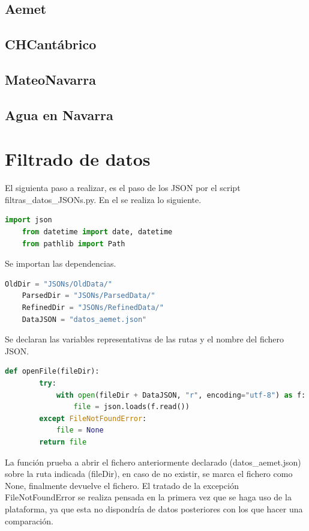 \subsection{Aemet}

\subsection{CHCantábrico}

\subsection{MateoNavarra}

\subsection{Agua en Navarra}

\section{Filtrado de datos}
El siguienta paso a realizar, es el paso de los JSON por el script filtras\_datos\_JSONs.py. En el se realiza lo siguiente.

\begin{lstlisting}[language=Python, caption={Import necesarios filtrado de datos}]
	import json
	from datetime import date, datetime
	from pathlib import Path
\end{lstlisting}

Se importan las dependencias.

\begin{lstlisting}[language=Python, caption={Declaración rutas JSONs y nombre de fichero}]
	OldDir = "JSONs/OldData/"
	ParsedDir = "JSONs/ParsedData/"
	RefinedDir = "JSONs/RefinedData/"
	DataJSON = "datos_aemet.json"
\end{lstlisting}

Se declaran las variables representativas de las rutas y el nombre del fichero JSON.

\begin{lstlisting}[language=Python, caption={Declaración función openFile()}]
	def openFile(fileDir):
		try:
			with open(fileDir + DataJSON, "r", encoding="utf-8") as f:
				file = json.loads(f.read())
		except FileNotFoundError:
			file = None
		return file
\end{lstlisting}

La función prueba a abrir el fichero anteriormente declarado (datos\_aemet.json) sobre la ruta indicada (fileDir), en caso de no existir, se marca el fichero como None, finalmente devuelve el fichero. El tratado de la excepción FileNotFoundError se realiza pensada en la primera vez que se haga uso de la plataforma, ya que esta no dispondría de datos posteriores con los que hacer una comparación.


